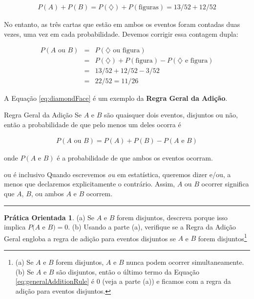 \documentclass[
]{book}
\theoremstyle{definition}
\theoremstyle{definition}
\theoremstyle{definition}
\newtheorem{exercise}{Prática Orientada}[chapter]
\theoremstyle{definition}
\theoremstyle{remark}
\begin{document}
\begin{eqnarray}
P(A) + P(B)
  = P({\diamondsuit}) + P(\text{figuras})
  = 13/52 + 12/52
  \label{eq:overCountFaceDiamond}
\end{eqnarray}

No entanto, as três cartas que estão em ambos os eventos foram contadas duas vezes, uma vez em cada probabilidade. Devemos corrigir essa contagem dupla:

\begin{eqnarray}
P(A\text{ ou } B) &=&P(\diamondsuit\text{ ou figura}) \\
  &=& P({\diamondsuit}) + P(\text{figura}) - P({\diamondsuit}\text{ e figura})  \\
  &=& 13/52 + 12/52 - 3/52 \\
  &=& 22/52 = 11/26 
    \label{eq:diamondFace}
\end{eqnarray}

A Equação \eqref{eq:diamondFace} é um exemplo da \textbf{Regra Geral da Adição}.

Regra Geral da Adição Se \(A\) e \(B\) são quaisquer dois eventos, disjuntos ou não, então a probabilidade de que pelo menos um deles ocorra é

\begin{eqnarray}
P(A\text{ ou }B) = P(A) + P(B) - P(A\text{ e }B)
\label{eq:generalAdditionRule}
\end{eqnarray}

onde \(P(A \text{ e }B)\) é a probabilidade de que ambos os eventos ocorram.

ou é inclusivo Quando escrevemos \emph{ou} em estatística, queremos dizer e/ou, a menos que declaremos explicitamente o contrário. Assim, \(A\) ou \(B\) ocorrer significa que \(A\), \(B\), ou ambos \(A\) e \(B\) ocorrem.

\begin{center}\rule{0.5\linewidth}{0.5pt}\end{center}

\begin{exercise}
\protect\hypertarget{exr:unnamed-chunk-49}{}{\label{exr:unnamed-chunk-49} }(a) Se \(A\) e \(B\) forem disjuntos, descreva porque isso implica \(P(A\) e \(B) = 0\).
(b) Usando a parte (a), verifique se a Regra da Adição Geral engloba a regra de adição para eventos disjuntos se \(A\) e \(B\) forem disjuntos\footnote{(a) Se \(A\) e \(B\) forem disjuntos, \(A\) e \(B\) nunca podem ocorrer simultaneamente. (b) Se \(A\) e \(B\) são disjuntos, então o último termo da Equação \eqref{eq:generalAdditionRule} é 0 (veja a parte (a)) e ficamos com a regra da adição para eventos disjuntos.}
\end{exercise}
\end{document}
